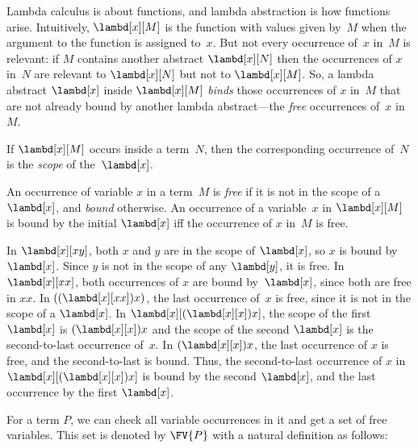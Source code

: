 \documentclass[../../../include/open-logic-section]{subfiles}
\begin{document}

Lambda calculus is about functions, and lambda abstraction is how
functions arise. Intuitively, $\lambd[x][M]$ is the function with
values given by~$M$ when the argument to the function is assigned
to~$x$. But not every occurrence of~$x$ in~$M$ is relevant: if $M$
contains another abstract $\lambd[x][N]$ then the occurrences of $x$
in~$N$ are relevant to $\lambd[x][N]$ but not to $\lambd[x][M]$.  So,
a lambda abstract $\lambd[x]$ inside $\lambd[x][M]$ \emph{binds} those
occurrences of $x$ in~$M$ that are not already bound by another lambda
abstract---the \emph{free} occurrences of~$x$ in~$M$.

\begin{defn}[Scope]
If $\lambd[x][M]$ occurs inside a term~$N$, then the corresponding
occurrence of~$N$ is the \emph{scope} of the~$\lambd[x]$.
\end{defn}


\begin{defn}
  An occurrence of variable $x$ in a term~$M$ is \emph{free} if it is
  not in the scope of a $\lambd[x]$, and \emph{bound} otherwise. An
  occurrence of a variable~$x$ in $\lambd[x][M]$ is bound by the initial
  $\lambd[x]$ iff the occurrence of $x$ in~$M$ is free.
\end{defn}

\begin{ex}
  In $\lambd[x][x y]$, both $x$ and $y$ are in the scope of $\lambd[x]$,
  so $x$ is bound by $\lambd[x]$. Since $y$ is not in the scope of
  any $\lambd[y]$, it is free.  In $\lambd[x][x x]$, both occurrences
  of $x$ are bound by~$\lambd[x]$, since both are free in $xx$.  In
  $((\lambd[x][xx])x)$, the last occurrence of~$x$ is free, since it
  is not in the scope of a $\lambd[x]$. In
  $\lambd[x][(\lambd[x][x])x]$, the scope of the first $\lambd[x]$ is
  $(\lambd[x][x])x$ and the scope of the second $\lambd[x]$ is the
  second-to-last occurrence of~$x$. In $(\lambd[x][x])x$, the last
  occurrence of $x$ is free, and the second-to-last is bound.  Thus,
  the second-to-last occurrence of $x$ in $\lambd[x][(\lambd[x][x])x]$
  is bound by the second $\lambd[x]$, and the last occurrence by the
  first $\lambd[x]$.
\end{ex}

For a term $P$, we can check all variable occurrences in it and get a
set of free variables. This set is denoted by $\FV{P}$ with a natural
definition as follows:
\end{document}
